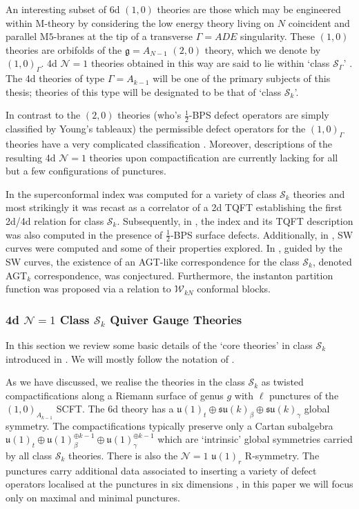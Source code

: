 \documentclass[main.tex]{subfiles}
\begin{document}
An interesting subset of 6d $(1,0)$ theories are those which may be engineered within M-theory by considering the low energy theory living on $N$ coincident and parallel M$5$-branes at the tip of a transverse $\Gamma=ADE$ singularity.  These $(1,0)$ theories are orbifolds of the $\mathfrak{g}=A_{N-1}$ $(2,0)$ theory, which we denote by $(1,0)_{\Gamma}$.  4d $\mathcal{N}=1$ theories obtained in this way are said to lie within `class $\mathcal{S}_{\Gamma}$' \cite{Gaiotto:2015usa,Heckman:2016xdl}.  The 4d theories of type $\Gamma=A_{k-1}$ will be one of the primary subjects of this thesis; theories of this type will be designated to be that of `class $\mathcal{S}_{k}$'.

In contrast to the $(2,0)$ theories (who's $\frac{1}{2}$-BPS defect operators are simply classified by Young's tableaux) the permissible defect operators for the $(1,0)_{\Gamma}$ theories have a very complicated classification \cite{Heckman:2016xdl}.  Moreover, descriptions of the resulting 4d $\mathcal{N}=1$ theories upon compactification are currently lacking for all but a few configurations of punctures.

In \cite{Gaiotto:2015usa} the superconformal index was computed for a variety of class $\mathcal{S}_k$ theories and most strikingly it was recast as a correlator of a 2d TQFT establishing the first 2d/4d relation for class $\mathcal{S}_k$.  Subsequently, in \cite{Ito:2016fpl,Maruyoshi:2016caf}, the index and its TQFT description was also computed in the presence of $\frac{1}{2}$-BPS surface defects.  Additionally, in \cite{Coman:2015bqq}, SW curves were computed and some of their properties explored.  In \cite{Mitev:2017jqj}, guided by the SW curves, the existence of an AGT-like correspondence for the class $\mathcal{S}_k$, denoted AGT$_k$ correspondence, was conjectured.  Furthermore, the instanton partition function was proposed  via a relation to $\mathcal{W}_{kN}$ conformal blocks.
\subsubsection{4d $\mathcal{N}=1$ Class $\mathcal{S}_k$ Quiver Gauge Theories}\label{sec:quivers}
In this section we review some basic details of the `core theories' in class $\mathcal{S}_k$ introduced in \cite{Gaiotto:2015usa}.  We will mostly follow the notation of \cite{Razamat:2018zus}.

As we have discussed, we realise the theories in the class $\mathcal{S}_k$ as twisted compactifications along a Riemann surface of genus $g$ with $\ell$ punctures of the $(1,0)_{A_{k-1}}$ SCFT.  The 6d theory has a $\mathfrak{u}(1)_t\oplus\mathfrak{su}(k)_{\beta}\oplus\mathfrak{su}(k)_{\gamma}$ global symmetry.  The compactifications typically preserve only a Cartan subalgebra $\mathfrak{u}(1)_t\oplus\mathfrak{u}(1)^{\oplus k-1}_{\beta}\oplus\mathfrak{u}(1)^{\oplus k-1}_{\gamma}$ which are `intrinsic' global symmetries carried by all class $\mathcal{S}_k$ theories.  There is also the $\mathcal{N}=1$ $\mathfrak{u}(1)_r$ R-symmetry.
The punctures carry additional data associated to inserting a variety of defect operators localised at the punctures in six dimensions \cite{Gaiotto:2015usa,Hassler:2017arf,Heckman:2016xdl}, in this paper we will focus only on maximal and minimal punctures.  
\end{document}
